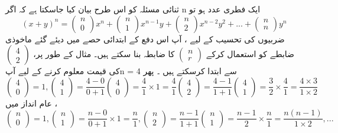 ثنائی مسئلہ کو اس طرح بیان کیا جاسکتا ہے کہ اگر n ایک فطری عدد ہو تو 
  \[(x+y)^{n}=
     \begin{pmatrix}
     n\\0
     \end{pmatrix}
     x^{n}+
      \begin{pmatrix}
    n\\1
     \end{pmatrix}
     x^{n-1}y+
      \begin{pmatrix}
    n\\2
     \end{pmatrix}
     x^{n-2}y^{2}+...+
      \begin{pmatrix}
    n\\n
     \end{pmatrix}
     y^{n}\]
ضربیوں کی تحسیب کے لیے ، آپ اس دفع کے ابتدائی حصے میں دیئے گئے ماخوذی ضابطے کو استعمال کرکے
\(\begin{pmatrix}
    n\\r
    \end{pmatrix}\)
کا ضابطہ بنا سکتے ہیں۔ مثال کے طور پر، 
\( \begin{pmatrix}
    4\\2
    \end{pmatrix}\)
کی قیمت معلوم کرنے کے لیے آپn = 4 سے ابتدا کرسکتے ہیں ۔ پھر 
  \[  \begin{pmatrix}
    4\\0
     \end{pmatrix}
     =1,
     \begin{pmatrix}
    4\\1
     \end{pmatrix}
     =\frac{4-0}{0+1}
     \begin{pmatrix}
    4\\0
     \end{pmatrix}
     =\frac{4}{1}\times1=\frac{4}{1}
     \begin{pmatrix}
     4\\2
     \end{pmatrix}
     =\frac{4-1}{1+1}
     \begin{pmatrix}
    4\\1
     \end{pmatrix}
     =\frac{3}{2}\times\frac{4}{1}=\frac{4\times3}{1\times2}\]
عام انداز میں ، 
         \[\begin{pmatrix}
     n\\0
     \end{pmatrix}
     =1,
     \begin{pmatrix}
    n\\1
     \end{pmatrix}
     =\frac{n-0}{0+1}\times1=\frac{n}{1},
     \begin{pmatrix}
     n\\2
     \end{pmatrix}
     =\frac{n-1}{1+1}
     \begin{pmatrix}
     n\\1
     \end{pmatrix}
     =\frac{n-1}{2}\times\frac{n}{1}=\frac{n(n-1)}{1\times2},...\]

